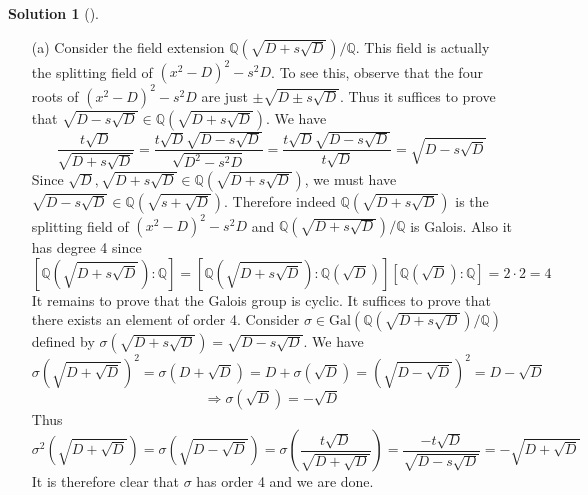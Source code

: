 \documentclass{article}
\theoremstyle{definition}
\newtheorem*{sol}{Solution}
\newenvironment{sols}[1][]{%
  \begin{sol}[#1]$ $\par\nobreak\ignorespaces
}{%
  \end{sol}
}
\newcommand{\QQ}{\mathbb Q}
\newcommand{\Ra}{\Rightarrow}
\newcommand{\Gal}{\text{Gal}}
\begin{document}
\begin{sols}
	\begin{enumerate}
		\item[(a)] Consider the field extension $\QQ(\sqrt{D + s \sqrt{D}})/\QQ$.
			This field is actually the splitting field of $(x^2 - D)^2 - s^2 D$.
			To see this, observe that the four roots of $(x^2 - D)^2 - s^2 D$ are just $\pm \sqrt{D \pm s\sqrt{D}}$.
			Thus it suffices to prove that $\sqrt{D - s\sqrt{D}} \in \QQ(\sqrt{D + s \sqrt{D}})$.
			We have
			\[
				\frac{t \sqrt{D}}{\sqrt{D + s \sqrt{D}}} = \frac{t \sqrt{D} \sqrt{D - s \sqrt{D}}}{\sqrt{D^2 - s^2 D}} = \frac{t \sqrt{D} \sqrt{D - s \sqrt{D}}}{t \sqrt{D}} = \sqrt{D - s \sqrt{D}}
			\]
			Since $\sqrt{D}, \sqrt{D + s \sqrt{D}} \in \QQ(\sqrt{D + s \sqrt{D}})$, we must have $\sqrt{D - s \sqrt{D}} \in \QQ(\sqrt{s + \sqrt{D}})$.
			Therefore indeed $\QQ(\sqrt{D + s \sqrt{D}})$ is the splitting field of $(x^2 - D)^2 - s^2 D$ and $\QQ(\sqrt{D + s \sqrt{D}})/\QQ$ is Galois.
			Also it has degree 4 since 
			\[
				\left[\QQ\left(\sqrt{D + s \sqrt{D}}\right):\QQ\right] = \left[\QQ\left(\sqrt{D + s\sqrt{D}}\right):\QQ(\sqrt{D})\right] [\QQ(\sqrt{D}): \QQ] = 2 \cdot 2 = 4
			\]
			It remains to prove that the Galois group is cyclic.
			It suffices to prove that there exists an element of order 4.
			Consider $\sigma \in \Gal(\QQ(\sqrt{D + s \sqrt{D}})/\QQ)$ defined by $\sigma(\sqrt{D + s \sqrt{D}}) = \sqrt{D - s \sqrt{D}}$.
			We have
			\[
				\sigma\left(\sqrt{D + \sqrt{D}}\right)^2 = \sigma(D + \sqrt{D}) = D + \sigma(\sqrt{D}) = \left(\sqrt{D - \sqrt{D}}\right)^2 = D - \sqrt{D}
			\]
			\[
				\Ra \sigma(\sqrt{D}) = - \sqrt{D}
			\]
			Thus
			\[
				\sigma^2\left(\sqrt{D + \sqrt{D}}\right) = \sigma\left(\sqrt{D - \sqrt{D}}\right) = \sigma \left( \frac{t \sqrt{D}}{\sqrt{D + \sqrt{D}}} \right) = \frac{- t \sqrt{D}}{\sqrt{D - s \sqrt{D}}} = - \sqrt{D + \sqrt{D}}
			\]
			It is therefore clear that $\sigma$ has order 4 and we are done.


\end{enumerate}
\end{sols}
\end{document}
